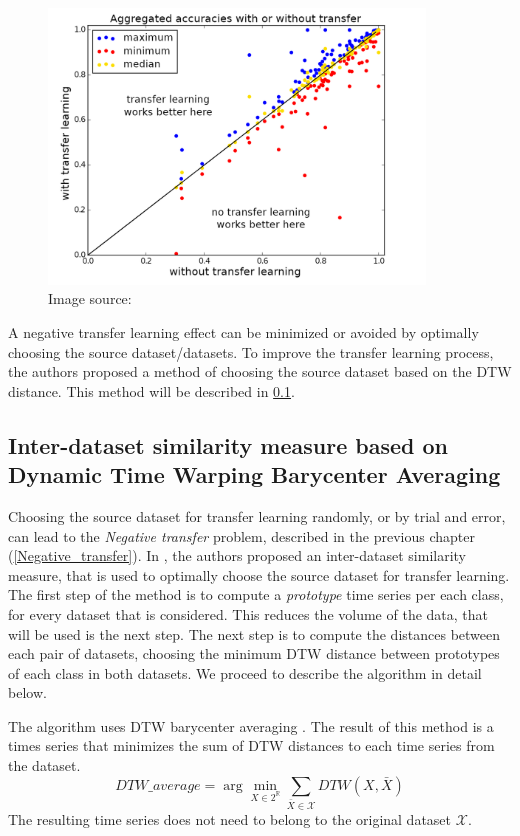 \documentclass[a4paper,11pt,twoside]{report}
\theoremstyle{definition}
\DeclareMathOperator{\real}{\mathbb{R}}
\begin{document}
\begin{figure}[h!]
\centering
\includegraphics[width=10cm]{imgs/max_min_transfer_learning.png}
\caption{Image source: \cite{transfer_learning_time_series}}
\label{fig:tr_learning_min_max}
\end{figure}
\FloatBarrier
A negative transfer learning effect can be minimized or avoided by optimally choosing the source dataset/datasets. To improve the transfer learning process, the authors proposed a method of choosing the source dataset based on the DTW distance. This method will be described in \ref{DTW_choosing}.

\subsection{Inter-dataset similarity measure based on Dynamic Time Warping Barycenter Averaging} \label{DTW_choosing}
Choosing the source dataset for transfer learning randomly, or by trial and error, can lead to the \textit{Negative transfer} problem, described in the previous chapter (\ref{Negative_transfer}). In \cite{transfer_learning_time_series}, the authors proposed an inter-dataset similarity measure, that is used to optimally choose the source dataset for transfer learning. The first step of the method is to compute a \textit{prototype} time series per each class, for every dataset that is considered. This reduces the volume of the data, that will be used is the next step. The next step is to compute the distances between each pair of datasets, choosing the minimum DTW distance between prototypes of each class in both datasets. We proceed to describe the algorithm in detail below.

The algorithm uses DTW barycenter averaging \cite{dtw_dba}.  The result of this method is a times series that minimizes the sum of DTW distances to each time series from the dataset.
$$DTW\_average = \arg\min_{X \in  2^{\real}}  \sum_{\bar{X}\in \mathcal{X}} DTW(X, \bar{X})$$
The resulting time series does not need to belong to the original dataset $\mathcal{X}$.
\end{document}
